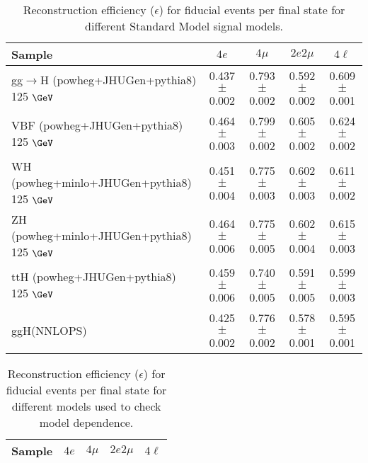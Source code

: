 \documentclass{article}
\begin{document}
\begin{table}[!h!tb]
\begin{center}
\small
\caption{
Reconstruction efficiency ($\epsilon$) for fiducial events per final state for different Standard Model signal models.
\label{tab:efficiencySM}
}
\begin{tabular}{|l|c|c|c|c|} \hline 
Sample & $4e$ & $4\mu$ & $2e2\mu$ & $4\ell$ \\ \hline 
gg$\rightarrow$H ({\sc powheg+JHUGen+pythia8}) 125 $\GeV$ & 0.437 $\pm$ 0.002 & 0.793 $\pm$ 0.002 & 0.592 $\pm$ 0.002 & 0.609 $\pm$ 0.001 \\ 
VBF ({\sc powheg+JHUGen+pythia8}) 125 $\GeV$ & 0.464 $\pm$ 0.003 & 0.799 $\pm$ 0.002 & 0.605 $\pm$ 0.002 & 0.624 $\pm$ 0.002 \\ 
WH ({\sc powheg+minlo+JHUGen+pythia8}) 125 $\GeV$ & 0.451 $\pm$ 0.004 & 0.775 $\pm$ 0.003 & 0.602 $\pm$ 0.003 & 0.611 $\pm$ 0.002 \\ 
ZH ({\sc powheg+minlo+JHUGen+pythia8}) 125 $\GeV$ & 0.464 $\pm$ 0.006 & 0.775 $\pm$ 0.005 & 0.602 $\pm$ 0.004 & 0.615 $\pm$ 0.003 \\ 
ttH ({\sc powheg+JHUGen+pythia8}) 125 $\GeV$ & 0.459 $\pm$ 0.006 & 0.740 $\pm$ 0.005 & 0.591 $\pm$ 0.005 & 0.599 $\pm$ 0.003 \\ 
ggH(NNLOPS) & 0.425 $\pm$ 0.002 & 0.776 $\pm$ 0.002 & 0.578 $\pm$ 0.001 & 0.595 $\pm$ 0.001 \\ 

\hline
\end{tabular}
\normalsize
\end{center}
\end{table}
 
 
 
\begin{table}[!h!tb]
\begin{center}
\small
\caption{
Reconstruction efficiency ($\epsilon$) for fiducial events per final state for different models used to check model dependence.
\label{tab:efficiencyExo}
}
\begin{tabular}{|l|c|c|c|c|} \hline 
Sample & $4e$ & $4\mu$ & $2e2\mu$ & $4\ell$ \\ \hline 

\hline
\end{tabular}
\normalsize
\end{center}
\end{table}
 
 
 
\end{document}
